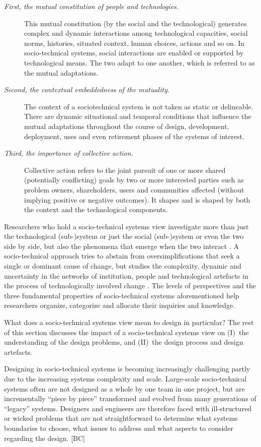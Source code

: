 \begin{description}
\item[\textit{First, the mutual constitution of people and technologies.}] 
This mutual constitution (by the social and the technological) generates complex and dynamic interactions among technological capacities, social norms, histories, situated context, human choices, actions and so on. In socio-technical systems, social interactions are enabled or supported by technological means. The two adapt to one another, which is referred to as the mutual adaptations. 
%
\item[\textit{Second, the contextual embeddedness of the mutuality.}] 
The context of a sociotechnical system is not taken as static or delineable. There are dynamic situational and temporal conditions that influence 
the mutual adaptations throughout the course of design, development, deployment, uses and even retirement phases of the systems of interest. 
%
\item[\textit{Third, the importance of collective action.}] 
Collective action refers to the joint pursuit of one or more shared (potentially conflicting) goals by two or more interested parties such as problem owners, shareholders, users  and communities affected (without implying positive or negative outcomes). It shapes and is shaped by both the context and the technological components. 
\end{description}
%
%
Researchers who hold a socio-technical systems view investigate more than just the technological (sub-)system or just the social (sub-)system or even the two side by side, but also the phenomena that emerge when the two interact \cite{Lee2001}. A socio-technical approach tries to abstain from oversimplifications that seek a single or dominant cause of change, but studies the complexity, dynamic and uncertainty in the networks of institution, people and technological artefacts in the process of technologically involved change \cite{Sawyer2014}. 
%
The levels of perspectives and the three fundamental properties of socio-technical systems aforementioned help researchers organize, categorize and allocate their inquiries and knowledge. 

What does a socio-technical systems view mean to design in particular? The rest of this section discusses the impact of a socio-technical systems view on (I)~the understanding of the design problems, and (II)~the design process and design artefacts.

 Designing in socio-technical systems is becoming increasingly challenging partly due to the increasing systems complexity and scale.  
Large-scale socio-technical systems often are not designed as a whole by one team in one project, but are incrementally ``piece by piece'' transformed and evolved from many generations of ``legacy'' systems. Designers and engineers are therefore faced with ill-structured or wicked problems that are not straightforward to determine what systems boundaries to choose, what issues to address and what aspects to consider regarding the design. [BC]

